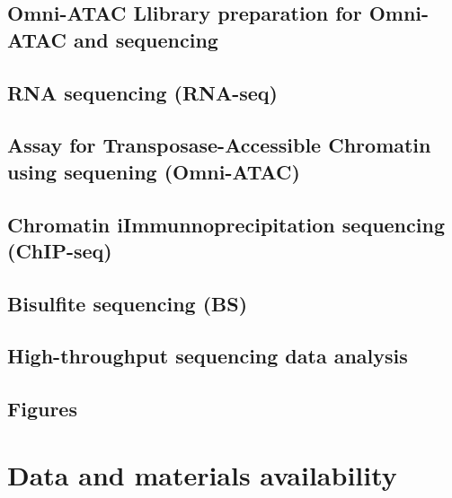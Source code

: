 \documentclass[12pt,twoside]{reedthesis}
\begin{document}
\hypertarget{omni-atac-llibrary-preparation-for-omni-atac-and-sequencing}{%
\subsection{Omni-ATAC Llibrary preparation for Omni-ATAC and sequencing}\label{omni-atac-llibrary-preparation-for-omni-atac-and-sequencing}}

\hypertarget{rna-sequencing-rna-seq}{%
\subsection{RNA sequencing (RNA-seq)}\label{rna-sequencing-rna-seq}}

\hypertarget{assay-for-transposase-accessible-chromatin-using-sequening-omni-atac}{%
\subsection{Assay for Transposase-Accessible Chromatin using sequening (Omni-ATAC)}\label{assay-for-transposase-accessible-chromatin-using-sequening-omni-atac}}

\hypertarget{chromatin-iimmunnoprecipitation-sequencing-chip-seq}{%
\subsection{Chromatin iImmunnoprecipitation sequencing (ChIP-seq)}\label{chromatin-iimmunnoprecipitation-sequencing-chip-seq}}

\hypertarget{bisulfite-sequencing-bs}{%
\subsection{Bisulfite sequencing (BS)}\label{bisulfite-sequencing-bs}}

\hypertarget{high-throughput-sequencing-data-analysis}{%
\subsection{High-throughput sequencing data analysis}\label{high-throughput-sequencing-data-analysis}}

\hypertarget{figures}{%
\subsection{Figures}\label{figures}}

\newpage

\hypertarget{data-and-materials-availability}{%
\section{Data and materials availability}\label{data-and-materials-availability}}
\end{document}
